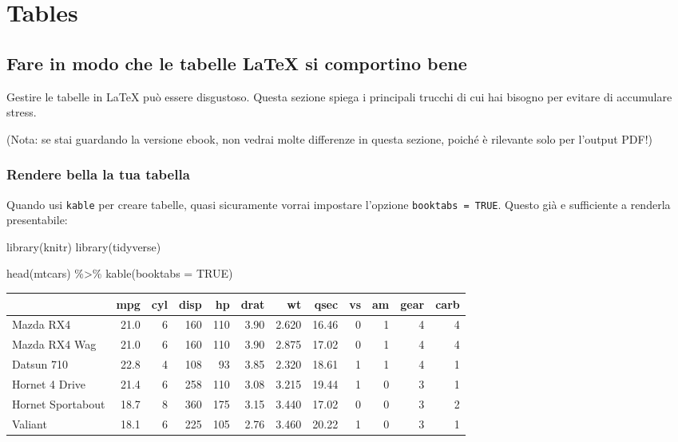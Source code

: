 \documentclass[a4paper, 11pt, nobind]{templates/ociamthesis}
\newenvironment{Shaded}{\begin{snugshade}}{\end{snugshade}}
\newcommand{\AttributeTok}[1]{\textcolor[rgb]{0.77,0.63,0.00}{#1}}
\newcommand{\ConstantTok}[1]{\textcolor[rgb]{0.00,0.00,0.00}{#1}}
\newcommand{\FunctionTok}[1]{\textcolor[rgb]{0.00,0.00,0.00}{#1}}
\newcommand{\NormalTok}[1]{#1}
\newcommand{\SpecialCharTok}[1]{\textcolor[rgb]{0.00,0.00,0.00}{#1}}
\renewenvironment{Shaded}
{
  \vspace{10pt}%
  \begin{snugshade}%
}{%
  \end{snugshade}%
  \vspace{8pt}%
}
\begin{document}
\hypertarget{tables}{%
\chapter{Tables}\label{tables}}

\minitoc 

\hypertarget{fare-in-modo-che-le-tabelle-latex-si-comportino-bene}{%
\section{Fare in modo che le tabelle LaTeX si comportino bene}\label{fare-in-modo-che-le-tabelle-latex-si-comportino-bene}}

Gestire le tabelle in LaTeX può essere disgustoso.
Questa sezione spiega i principali trucchi di cui hai bisogno per evitare di accumulare stress.

(Nota: se stai guardando la versione ebook, non vedrai molte differenze in questa sezione, poiché è rilevante solo per l'output PDF!)

\hypertarget{rendere-bella-la-tua-tabella}{%
\subsection{Rendere bella la tua tabella}\label{rendere-bella-la-tua-tabella}}

Quando usi \texttt{kable} per creare tabelle, quasi sicuramente vorrai impostare l'opzione \texttt{booktabs\ =\ TRUE}.
Questo già e sufficiente a renderla presentabile:

\begin{Shaded}
\begin{Highlighting}[]
\FunctionTok{library}\NormalTok{(knitr)}
\FunctionTok{library}\NormalTok{(tidyverse)}

\FunctionTok{head}\NormalTok{(mtcars) }\SpecialCharTok{\%\textgreater{}\%} 
  \FunctionTok{kable}\NormalTok{(}\AttributeTok{booktabs =} \ConstantTok{TRUE}\NormalTok{)}
\end{Highlighting}
\end{Shaded}

\begin{tabular}{lrrrrrrrrrrr}
\toprule
  & mpg & cyl & disp & hp & drat & wt & qsec & vs & am & gear & carb\\
\midrule
Mazda RX4 & 21.0 & 6 & 160 & 110 & 3.90 & 2.620 & 16.46 & 0 & 1 & 4 & 4\\
Mazda RX4 Wag & 21.0 & 6 & 160 & 110 & 3.90 & 2.875 & 17.02 & 0 & 1 & 4 & 4\\
Datsun 710 & 22.8 & 4 & 108 & 93 & 3.85 & 2.320 & 18.61 & 1 & 1 & 4 & 1\\
Hornet 4 Drive & 21.4 & 6 & 258 & 110 & 3.08 & 3.215 & 19.44 & 1 & 0 & 3 & 1\\
Hornet Sportabout & 18.7 & 8 & 360 & 175 & 3.15 & 3.440 & 17.02 & 0 & 0 & 3 & 2\\
\addlinespace
Valiant & 18.1 & 6 & 225 & 105 & 2.76 & 3.460 & 20.22 & 1 & 0 & 3 & 1\\
\bottomrule
\end{tabular}
\end{document}
